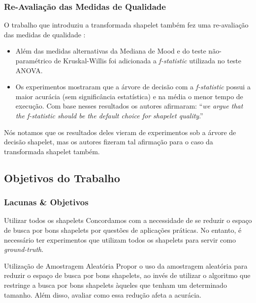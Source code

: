 \documentclass{beamer}
\begin{document}
\begin{frame}
\frametitle{Re-Avalia{\c c}{\~a}o das Medidas de Qualidade}

O trabalho que introduziu a transformada shapelet tamb{\'e}m fez uma re-avalia{\c c}{\~a}o das medidas de qualidade \cite{Hills:2013dk}:

\begin{itemize}
\item Al{\'e}m das medidas alternativas da Mediana de Mood e do teste n{\~a}o-param{\'e}trico de Kruskal-Willis foi adicionada a \textit{f-statistic} utilizada no teste ANOVA.
\item Os experimentos mostraram que a {\'a}rvore de decis{\~a}o com a \textit{f-statistic} possui a maior acur{\'a}cia (sem signific{\^a}ncia estat{\'i}stica) e na m{\'e}dia o menor tempo de execu{\c c}{\~a}o. Com base nesses resultados os autores afirmaram: ``\textit{we argue that the f-statistic should be the default choice for shapelet quality}.''
\end{itemize}

N{\'o}s notamos que os resultados deles vieram de experimentos sob a {\'a}rvore de decis{\~a}o shapelet, mas os autores fizeram tal afirma{\c c}{\~a}o para o caso da transformada shapelet tamb{\'e}m.
\end{frame}


\begin{frame}
\subsection{Objetivos do Trabalho}
\frametitle{Lacunas \& Objetivos}

\begin{block}{Utilizar todos os shapelets}
Concordamos com a necessidade de se reduzir o espa{\c c}o de busca por bons shapelets por quest{\~o}es de aplica{\c c}{\~o}es pr{\'a}ticas. No entanto, {\'e} necess{\'a}rio ter experimentos que utilizam todos os shapelets para servir como \textit{ground-truth}.
\end{block}

\begin{block}{Utiliza{\c c}{\~a}o de Amostragem Aleat{\'o}ria}
Propor o uso da amostragem aleat{\'o}ria para reduzir o espa{\c c}o de busca por bons shapelets, ao inv{\'e}s de utilizar o algoritmo que restringe a busca por bons shapelets {\`a}queles que tenham um determinado tamanho. Al{\'e}m disso, avaliar como essa redu{\c c}{\~a}o afeta a acur{\'a}cia.
\end{block}
\end{frame}
\end{document}

